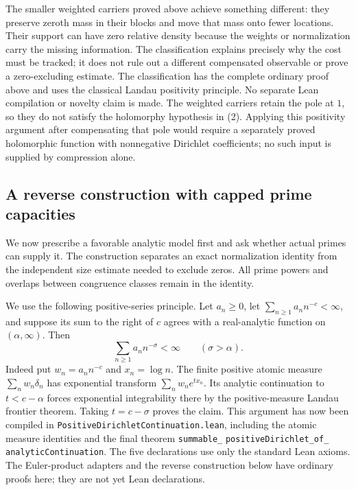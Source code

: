 \documentclass[11pt]{article}
\theoremstyle{definition}
\begin{document}
The smaller weighted carriers proved above achieve
something different: they preserve zeroth mass in their
blocks and move that mass onto fewer locations.
Their support can have zero relative density because the
weights or normalization carry the missing information.
The classification explains precisely why the cost must be
tracked; it does not rule out a different compensated
observable or prove a zero-excluding estimate.
The classification has the complete ordinary proof above
and uses the classical Landau positivity principle.
No separate Lean compilation or novelty claim is made.
The weighted carriers retain the pole at $1$, so they do not
satisfy the holomorphy hypothesis in (2). Applying this
positivity argument after compensating that pole would
require a separately proved holomorphic function with
nonnegative Dirichlet coefficients; no such input is supplied
by compression alone.

\subsection{A reverse construction with capped prime capacities}
\label{sec:reverse-prime-capacity}

We now prescribe a favorable analytic model first and ask whether
actual primes can supply it. The construction separates an exact
normalization identity from the independent size estimate needed
to exclude zeros. All prime powers and overlaps between congruence
classes remain in the identity.

We use the following positive-series principle. Let $a_n\ge0$,
let $\sum_{n\ge1}a_n n^{-c}<\infty$, and suppose its sum to the
right of $c$ agrees with a real-analytic function on
$(\alpha,\infty)$. Then
\begin{equation}
 \sum_{n\ge1}a_n n^{-\sigma}<\infty
 \qquad(\sigma>\alpha).
 \label{eq:positive-dirichlet-continuation-core}
\end{equation}
Indeed put $w_n=a_n n^{-c}$ and $x_n=\log n$. The finite positive
atomic measure $\sum_n w_n\delta_n$ has exponential transform
$\sum_n w_n e^{t x_n}$. Its analytic continuation to $t<c-\alpha$
forces exponential integrability there by the positive-measure
Landau frontier theorem. Taking $t=c-\sigma$ proves the claim.
This argument has now been compiled in
\texttt{PositiveDirichletContinuation.lean},
including the atomic measure identities and the final theorem
\texttt{summable\_}\allowbreak
\texttt{positiveDirichlet\_of\_}\allowbreak
\texttt{analyticContinuation}.
The five declarations use only the standard Lean axioms.
The Euler-product adapters and the reverse construction below
have ordinary proofs here; they are not yet Lean declarations.
\end{document}
